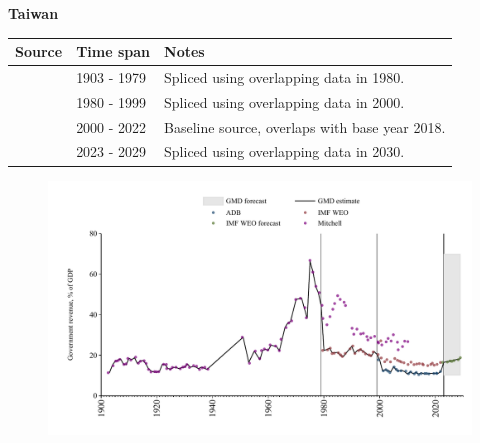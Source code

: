 \documentclass[12pt,a4paper,landscape]{article}
\begin{document}
\begin{adjustbox}{max totalsize={\paperwidth}{\paperheight},center}
\begin{minipage}[t][\textheight][t]{\textwidth}
\vspace*{0.5cm}
{}
\begin{center}
{\Large\bfseries Taiwan}
\end{center}
\vspace{0.5cm}
\begin{table}[H]
\centering
\small
\begin{tabular}{|l|l|l|}
\hline
\textbf{Source} & \textbf{Time span} & \textbf{Notes} \\
\hline
\rowcolor{white}\cite{Mitchell}& 1903 - 1979 &Spliced using overlapping data in 1980.\\
\rowcolor{lightgray}\cite{IMF_WEO}& 1980 - 1999 &Spliced using overlapping data in 2000.\\
\rowcolor{white}\cite{ADB}& 2000 - 2022 &Baseline source, overlaps with base year 2018.\\
\rowcolor{lightgray}\cite{IMF_WEO_forecast}& 2023 - 2029 &Spliced using overlapping data in 2030.\\
\hline
\end{tabular}
\end{table}
\begin{figure}[H]
\centering
\includegraphics[width=\textwidth,height=0.6\textheight,keepaspectratio]{graphs/TWN_govrev_GDP.pdf}
\end{figure}
\end{minipage}
\end{adjustbox}
\end{document}
